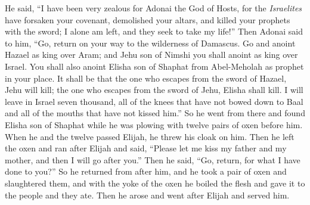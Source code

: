 \begin{biblechapter}
\verse He said, “I have been very zealous for Adonai the God of Hosts, for the \textit{Israelites} have forsaken your covenant, demolished your altars, and killed your prophets with the sword; I alone am left, and they seek to take my life!”
\verse Then Adonai said to him, “Go, return on your way to the wilderness of Damascus. Go and anoint Hazael as king over Aram;
\verse and Jehu son of Nimshi you shall anoint as king over Israel. You shall also anoint Elisha son of Shaphat from Abel-Meholah as prophet in your place.
\verse It shall be that the one who escapes from the sword of Hazael, Jehu will kill; the one who escapes from the sword of Jehu, Elisha shall kill.
\verse I will leave in Israel seven thousand, all of the knees that have not bowed down to Baal and all of the mouths that have not kissed him.”
\verse So he went from there and found Elisha son of Shaphat while he was plowing with twelve pairs of oxen before him. When he and the twelve passed Elijah, he threw his cloak on him.
\verse Then he left the oxen and ran after Elijah and said, “Please let me kiss my father and my mother, and then I will go after you.” Then he said, “Go, return, for what I have done to you?”
\verse So he returned from after him, and he took a pair of oxen and slaughtered them, and with the yoke of the oxen he boiled the flesh and gave it to the people and they ate. Then he arose and went after Elijah and served him.
\end{biblechapter}

